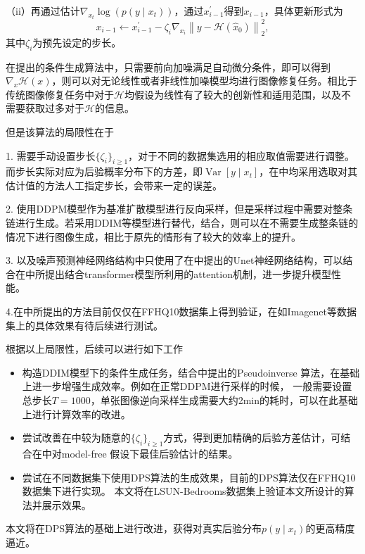 （ii）再通过估计$\nabla_{x_t}\log(p(y\mid x_t))$，通过$x_{i-1}^{\prime}$得到$x_{i-1}$，具体更新形式为
\begin{equation}
    x_{i-1} \leftarrow x_{i-1}^{\prime}-\zeta_i \nabla_{x_i}\left\|y-\mathcal{H}\left(\hat{x}_0\right)\right\|_2^2, \label{update 2 DPS}
\end{equation}
其中$\zeta_i$为预先设定的步长。

在\cite{Inverse}提出的条件生成算法中，只需要前向加噪满足自动微分条件，即可以得到$\nabla_x\mathcal{H}(x)$，则可以对无论线性或者非线性加噪模型均进行图像修复任务。相比于传统图像修复任务中对于$\mathcal{H}$均假设为线性有了较大的创新性和适用范围，以及不需要获取过多对于$\mathcal{H}$的信息。     

但是该算法的局限性在于      


1. 需要手动设置步长$\{\zeta_i\}_{i\geq 1}$，对于不同的数据集选用的相应取值需要进行调整。 而步长实际对应为后验概率分布下的方差，即$\operatorname{Var}\left[y\mid x_t\right]$，在\cite{song2023pseudoinverse,Inverse}中均采用选取对其估计值的方法人工指定步长，会带来一定的误差。   


2. 使用DDPM模型作为基准扩散模型进行反向采样，但是采样过程中需要对整条链进行生成。若采用DDIM等模型进行替代，结合\cite{DDIM}，则可以在不需要生成整条链的情况下进行图像生成，相比于原先的情形有了较大的效率上的提升。   

3. 以及噪声预测神经网络结构中只使用了在\cite{Unet}中提出的Unet神经网络结构，可以结合在\cite{DDIM,VAE_diffusion}中所提出结合transformer模型所利用的attention机制，进一步提升模型性能。     

4.在\cite{Inverse}中所提出的方法目前仅仅在FFHQ10数据集上得到验证，在如Imagenet等数据集上的具体效果有待后续进行测试。    

根据以上局限性，后续可以进行如下工作
\begin{itemize}
    \item 构造DDIM模型下的条件生成任务，结合\cite{song2023pseudoinverse}中提出的Pseudoinverse 算法，在\cite{Inverse}基础上进一步增强生成效率。例如在正常DDPM进行采样的时候， 一般需要设置总步长$T=1000$，单张图像逆向采样生成需要大约2min的耗时，可以在此基础上进行计算效率的改进。 
    \item  尝试改善在\cite{Inverse}中较为随意的$\{\zeta_i\}_{i\geq 1}$方式，得到更加精确的后验方差估计，可结合在\cite{Analytic_DPM}中对model-free 假设下最佳后验估计的结果。
    \item 尝试在不同数据集下使用DPS算法的生成效果，目前的DPS算法仅在FFHQ10数据集下进行实现。 本文将在LSUN-Bedrooms数据集上验证本文所设计的算法并展示效果。    
\end{itemize}
本文将在DPS算法\cite{Inverse}的基础上进行改进，获得对真实后验分布$p(y\mid x_t)$的更高精度逼近。